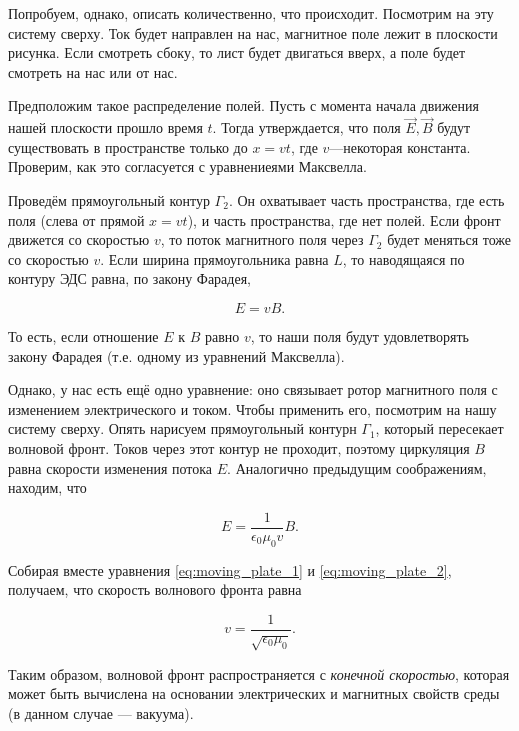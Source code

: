 \documentclass[11pt,a4paper]{article}
\numberwithin{equation}{section}
\newcommand{\eps}{\epsilon}
\begin{document}
Попробуем, однако, описать количественно, что происходит. Посмотрим на
эту систему сверху. Ток будет направлен на нас, магнитное поле лежит
в плоскости рисунка. Если смотреть сбоку, то лист будет двигаться
вверх, а поле будет смотреть на нас или от нас. 

Предположим такое распределение полей. Пусть с момента начала движения
нашей плоскости прошло время $t$. Тогда утверждается, что поля
$\vec{E}, \vec{B}$ будут существовать в пространстве только до
$x=vt$, где $v$---некоторая константа. Проверим, как это согласуется с
уравнениеями Максвелла. 

Проведём прямоугольный контур $\Gamma_2$. Он охватывает часть
пространства, где есть поля (слева от прямой $x=vt$), и часть
пространства, где нет полей. Если фронт движется со скоростью $v$, то
поток магнитного поля через $\Gamma_2$ будет меняться тоже со
скоростью $v$. Если ширина прямоугольника равна $L$, то наводящаяся по
контуру ЭДС равна, по закону Фарадея, 

\begin{equation}
  \label{eq:moving_plate_1}
  E = v B.
\end{equation}

То есть, если отношение $E$ к $B$ равно $v$, то наши поля будут
удовлетворять закону Фарадея (т.е. одному из уравнений Максвелла). 

Однако, у нас есть ещё одно уравнение: оно связывает ротор магнитного
поля с изменением электрического и током. Чтобы применить его,
посмотрим на нашу систему сверху. Опять нарисуем прямоугольный
контурн $\Gamma_1$, который пересекает волновой фронт. Токов через
этот контур не проходит, поэтому циркуляция $B$ равна скорости
изменения потока $E$. Аналогично предыдущим соображениям, находим, что 

\begin{equation}
  \label{eq:moving_plate_2}
  E = \frac{1}{\eps_0 \mu_0 v} B.
\end{equation}

Собирая вместе уравнения \eqref{eq:moving_plate_1} и
\eqref{eq:moving_plate_2}, получаем, что скорость волнового фронта
равна 

\begin{equation}
  \label{eq:velocity_front}
  v = \frac{1}{\sqrt{\eps_0 \mu_0}}.
\end{equation}

Таким образом, волновой фронт распространяется с \textit{конечной
  скоростью}, которая может быть вычислена на основании электрических
и магнитных свойств среды (в данном случае --- вакуума). 
\end{document}
